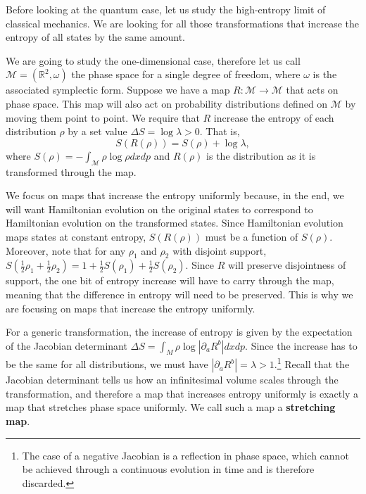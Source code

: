 \documentclass{article}
\begin{document}
Before looking at the quantum case, let us study the high-entropy limit of classical mechanics. We are looking for all those transformations that increase the entropy of all states by the same amount.

We are going to study the one-dimensional case, therefore let us call $\mathcal{M} = (\mathbb{R}^2, \omega)$ the phase space for a single degree of freedom, where $\omega$ is the associated symplectic form. Suppose we have a map $R : \mathcal{M} \to \mathcal{M}$ that acts on phase space. This map will also act on probability distributions defined on $\mathcal{M}$ by moving them point to point. We require that $R$ increase the entropy of each distribution $\rho$ by a set value $\Delta S = \log \lambda > 0$. That is,
\begin{equation}
S(R(\rho)) = S(\rho) + \log \lambda,
\end{equation}
where $S(\rho) = - \int_{\mathcal{M}} \rho \log \rho dx dp$ and $R(\rho)$ is the distribution as it is transformed through the map.

We focus on maps that increase the entropy uniformly because, in the end, we will want Hamiltonian evolution on the original states to correspond to Hamiltonian evolution on the transformed states. Since Hamiltonian evolution maps states at constant entropy, $S(R(\rho))$ must be a function of $S(\rho)$. Moreover, note that for any $\rho_1$ and $\rho_2$ with disjoint support, $S\left(\frac{1}{2}\rho_1 + \frac{1}{2}\rho_2\right) = 1 + \frac{1}{2}S\left(\rho_1\right) + \frac{1}{2}S\left(\rho_2\right)$. Since $R$ will preserve disjointness of support, the one bit of entropy increase will have to carry through the map, meaning that the difference in entropy will need to be preserved. This is why we are focusing on maps that increase the entropy uniformly.

For a generic transformation, the increase of entropy is given by the expectation of the Jacobian determinant $\Delta S =\int_M \rho \log |\partial_a R^b| dxdp$. Since the increase has to be the same for all distributions, we must have $|\partial_a R^b| = \lambda > 1$.\footnote{The case of a negative Jacobian is a reflection in phase space, which cannot be achieved through a continuous evolution in time and is therefore discarded.} Recall that the Jacobian determinant tells us how an infinitesimal volume scales through the transformation, and therefore a map that increases entropy uniformly is exactly a map that stretches phase space uniformly. We call such a map a \textbf{stretching map}.
\end{document}
